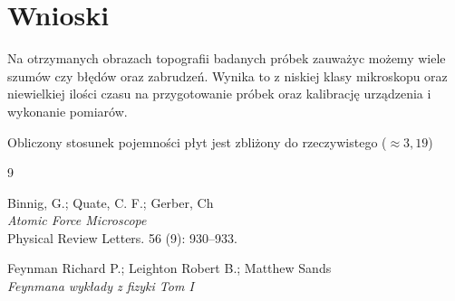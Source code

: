 \documentclass[a4paper,12pt]{extarticle}
\begin{document}
  \section{Wnioski}
  Na otrzymanych obrazach topografii badanych próbek zauważyc możemy wiele szumów
  czy błędów oraz zabrudzeń. Wynika to z niskiej klasy mikroskopu oraz niewielkiej
  ilości czasu na przygotowanie próbek oraz kalibrację urządzenia i wykonanie
  pomiarów.
  
  Obliczony stosunek pojemności płyt jest zbliżony do rzeczywistego
  (\( \approx 3,19 \))

  \clearpage
  \begin{thebibliography}{9}
    
    Binnig, G.; Quate, C. F.; Gerber, Ch\\
    \textit{Atomic Force Microscope}\\
    Physical Review Letters. 56 (9): 930–933. 

    Feynman Richard P.; Leighton Robert B.; Matthew Sands\\
    \textit{Feynmana wykłady z fizyki Tom I}
  \end{thebibliography}
\end{document}
